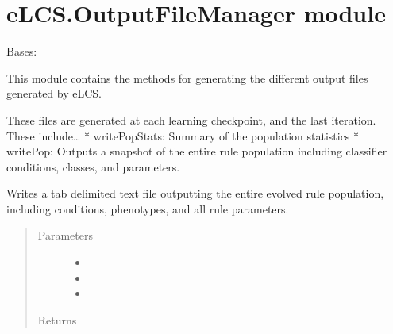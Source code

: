 \documentclass[letterpaper,10pt,english]{sphinxmanual}
\begin{document}
\section{eLCS.OutputFileManager module}
\label{\detokenize{eLCS:elcs-outputfilemanager-module}}\label{\detokenize{eLCS:module-eLCS.OutputFileManager}}

\begin{fulllineitems}
\label{\detokenize{eLCS:eLCS.OutputFileManager.OutputFileManager}}
Bases: 

This module contains the methods for generating the different output files generated by eLCS.

These files are generated at each learning checkpoint, and the last iteration.  These include…
* writePopStats: Summary of the population statistics
* writePop: Outputs a snapshot of the entire rule population including classifier conditions, classes, and parameters.

\begin{fulllineitems}
\label{\detokenize{eLCS:eLCS.OutputFileManager.OutputFileManager.writePop}}
Writes a tab delimited text file outputting the entire evolved rule population, including conditions,
phenotypes, and all rule parameters.
\begin{quote}\begin{description}
\item[{Parameters}] \leavevmode\begin{itemize}
\item {} 
 \textendash{} 

\item {} 
 \textendash{} 

\item {} 
 \textendash{} 

\end{itemize}

\item[{Returns}] \leavevmode


\end{description}\end{quote}


\end{fulllineitems}
\end{fulllineitems}
\end{document}
